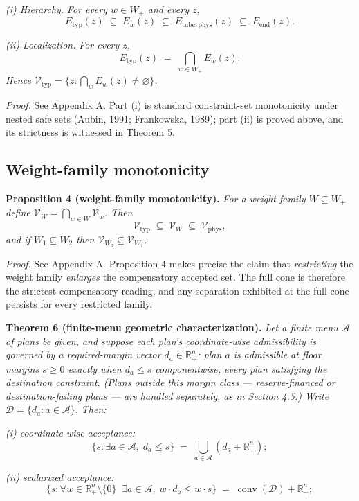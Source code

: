 \documentclass[3p,11pt]{elsarticle}
\begin{document}
\emph{(i) Hierarchy.} \emph{For every \(w \in W_+\) and every \(z\),}
\[E_{\mathrm{typ}}(z) \;\subseteq\; E_w(z) \;\subseteq\; E_{\mathrm{tube,phys}}(z) \;\subseteq\; E_{\mathrm{end}}(z).\]

\emph{(ii) Localization.} \emph{For every \(z\),}
\[E_{\mathrm{typ}}(z) \;=\; \bigcap_{w \in W_+} E_w(z).\] \emph{Hence
\(\mathcal{V}_{\mathrm{typ}} = \{ z : \bigcap_w E_w(z) \neq \varnothing \}\).}

\emph{Proof.} See Appendix A. Part (i) is standard constraint-set monotonicity under nested safe sets (Aubin, 1991; Frankowska, 1989); part (ii) is proved above, and its strictness is witnessed in Theorem 5.

\subsection{Weight-family
monotonicity}\label{weight-family-monotonicity}

\textbf{Proposition 4 (weight-family monotonicity).} \emph{For a weight
family \(W \subseteq W_+\) define
\(\mathcal{V}_W = \bigcap_{w \in W} \mathcal{V}_w\). Then}
\[\mathcal{V}_{\mathrm{typ}} \;\subseteq\; \mathcal{V}_W \;\subseteq\; \mathcal{V}_{\mathrm{phys}},\]
\emph{and if \(W_1 \subseteq W_2\) then
\(\mathcal{V}_{W_2} \subseteq \mathcal{V}_{W_1}\).}

\emph{Proof.} See Appendix A. Proposition 4 makes precise the claim that \emph{restricting} the weight
family \emph{enlarges} the compensatory accepted set. The full cone is
therefore the strictest compensatory reading, and any separation
exhibited at the full cone persists for every restricted family.

\textbf{Theorem 6 (finite-menu geometric characterization).} \emph{Let a
finite menu \(\mathcal{A}\) of plans be given, and suppose each plan's
coordinate-wise admissibility is governed by a required-margin vector
\(d_a \in \mathbb{R}^n_+\): plan \(a\) is admissible at floor margins
\(s \ge 0\) exactly when \(d_a \le s\) componentwise, every plan
satisfying the destination constraint. (Plans outside this margin class
--- reserve-financed or destination-failing plans --- are handled
separately, as in Section 4.5.) Write \(\mathcal{D} = \{d_a : a \in \mathcal{A}\}\).}
\emph{Then:}

\emph{(i) coordinate-wise acceptance:}
\[
\{ s : \exists a \in \mathcal{A},\; d_a \le s \}
\;=\; \bigcup_{a \in \mathcal{A}} (d_a + \mathbb{R}^n_+);
\]

\emph{(ii) scalarized acceptance:}
\[
\{ s : \forall w \in \mathbb{R}^n_+ \setminus \{0\} \;\; \exists a \in
\mathcal{A},\; w \cdot d_a \le w \cdot s \}
\;=\; \operatorname{conv}(\mathcal{D}) + \mathbb{R}^n_+;
\]
\end{document}
